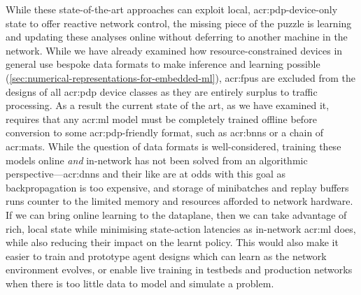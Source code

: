 While these state-of-the-art approaches can exploit local, \gls{acr:pdp}-device-only state to offer reactive network control, the missing piece of the puzzle is learning and updating these analyses online without deferring to another machine in the network.
While we have already examined how resource-constrained devices in general use bespoke data formats to make inference and learning possible (\cref{sec:numerical-representations-for-embedded-ml}), \glspl{acr:fpu} are excluded from the designs of all \gls{acr:pdp} device classes as they are entirely surplus to traffic processing.
As a result the current state of the art, as we have examined it, requires that any \gls{acr:ml} model must be completely trained offline before conversion to some \gls{acr:pdp}-friendly format, such as \glspl{acr:bnn} or a chain of \glspl{acr:mat}.
While the question of data formats is well-considered, training these models online \emph{and} in-network has not been solved from an algorithmic perspective---\glspl{acr:dnn} and their like are at odds with this goal as backpropagation is too expensive, and storage of minibatches and replay buffers runs counter to the limited memory and resources afforded to network hardware.
If we can bring online learning to the dataplane, then we can take advantage of rich, local state while minimising state-action latencies as in-network \gls{acr:ml} does, while also reducing their impact on the learnt policy.
This would also make it easier to train and prototype agent designs which can learn as the network environment evolves, or enable live training in testbeds and production networks when there is too little data to model and simulate a problem.

